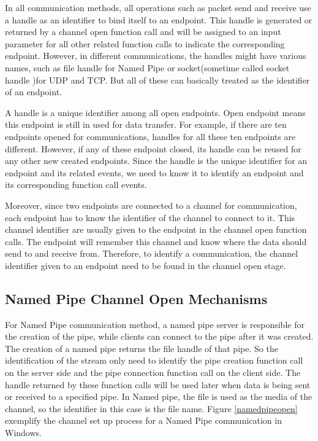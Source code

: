 In all communication methods, all operations such as packet send and receive use a handle as an identifier to bind itself to an endpoint. This handle is generated or returned by a channel open function call and will be assigned to an input parameter for all other related function calls to indicate the corresponding endpoint. However, in different communications, the handles might have various names, such as file handle for Named Pipe or socket(sometime called socket handle )for UDP and TCP. But all of these can basically treated as the identifier of an endpoint.

A handle is a unique identifier among all open endpoints. Open endpoint means this endpoint is still in used for data transfer. For example, if there are ten endpoints opened for communications, handles for all these ten endpoints are different. However, if any of these endpoint closed, its handle can be reused for any other new created endpoints. Since the handle is the unique identifier for an endpoint and its related events, we need to know it to identify an endpoint and its corresponding function call events. 

Moreover, since two endpoints are connected to a channel for communication, each endpoint has to know the identifier of the channel to connect to it. This channel identifier are usually given to the endpoint in the channel open function calls. The endpoint will remember this channel and know where the data should send to and receive from. Therefore, to identify a communication, the channel identifier given to an endpoint need to be found in the channel open stage.

\subsection{Named Pipe Channel Open Mechanisms} 
For Named Pipe communication method, a named pipe server is responsible for the creation of the pipe, while clients can connect to the pipe after it was created. The creation of a named pipe returns the file handle of that pipe. So the identification of the stream only need to identify the pipe creation function call on the server side and the pipe connection function call on the client side. The  handle returned by these function calls will be used later when data is being sent or received to a specified pipe. In Named pipe, the file is used as the media of the channel, so the identifier in this case is the file name. Figure \ref{namedpipeopen} exemplify the channel set up process for a Named Pipe communication in Windows. 

